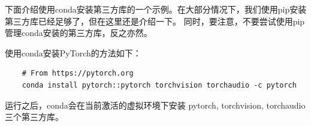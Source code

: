 下面介绍使用conda安装第三方库的一个示例。在大部分情况下，我们使用pip安装第三方库已经足够了，但在这里还是介绍一下。
同时，要注意，不要尝试使用pip管理conda安装的第三方库，反之亦然。

使用conda安装PyTorch的方法如下：
\begin{lstlisting}
    # From https://pytorch.org
    conda install pytorch::pytorch torchvision torchaudio -c pytorch
\end{lstlisting}
运行之后，conda会在当前激活的虚拟环境下安装 pytorch, torchvision, torchaudio 三个第三方库。